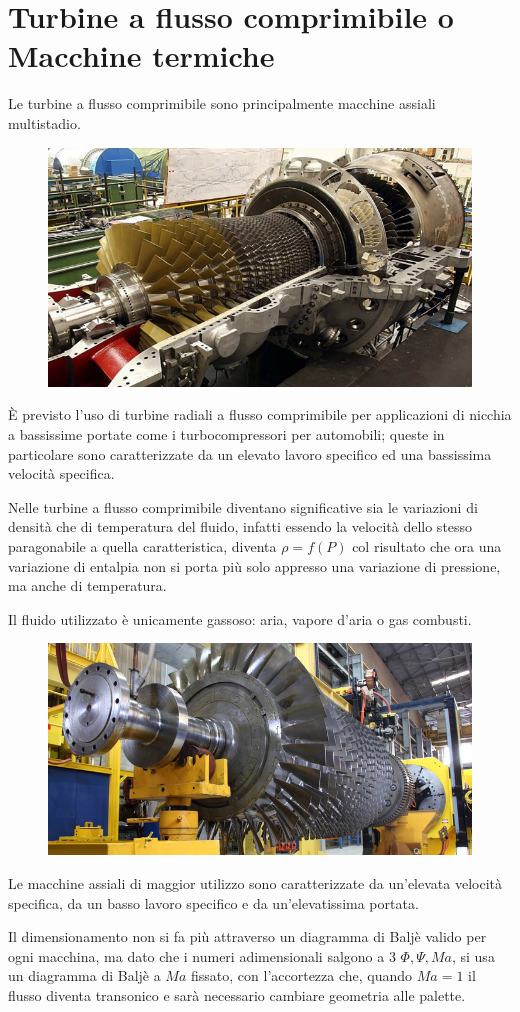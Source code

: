 \documentclass[a4paper, 15pt]{article}
\begin{document}
\newpage




\part{Turbine a flusso comprimibile o Macchine termiche}
\begin{adjustwidth}{2in}{}
	Le turbine a flusso comprimibile sono principalmente macchine assiali multistadio. 
	\begin{figure}[H]
		\centering
		\includegraphics[width=0.5\linewidth]{immagini/gas1}
		\label{fig:gas1}
	\end{figure}	
	È previsto l'uso di turbine radiali a flusso comprimibile per applicazioni di nicchia a bassissime portate come i turbocompressori per automobili; queste in particolare sono caratterizzate da un elevato lavoro specifico ed una bassissima velocità specifica.\newline 
	
	Nelle turbine a flusso comprimibile diventano significative sia le variazioni di densità che di temperatura del fluido, infatti essendo la velocità dello stesso paragonabile a quella caratteristica, diventa $\rho = f(P)$ col risultato che ora una variazione di entalpia non si porta più solo appresso una variazione di pressione, ma anche di temperatura. \newline 
	
	Il fluido utilizzato è unicamente gassoso: aria, vapore d'aria o gas combusti. 
	\begin{figure}[H]
		\centering
		\includegraphics[width=0.5\linewidth]{immagini/gas2}
		\label{fig:gas2}
	\end{figure}
	Le macchine assiali di maggior utilizzo sono caratterizzate da un'elevata velocità specifica, da un basso lavoro specifico e da un'elevatissima portata. \newline 
	
	Il dimensionamento non si fa più attraverso un diagramma di Baljè valido per ogni macchina, ma dato che i numeri adimensionali salgono a 3 $\Phi, \Psi, Ma$, si usa un diagramma di Baljè a $Ma$ fissato, con l'accortezza che, quando $Ma=1$ il flusso diventa transonico e sarà necessario cambiare geometria alle palette. 
\end{adjustwidth}
\end{document}
